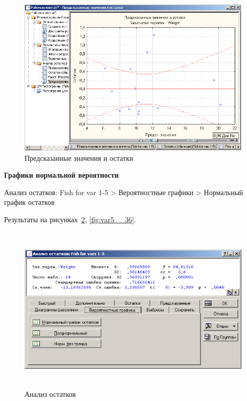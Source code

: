\begin{figure}[!h]
  \centering

  \includegraphics[width=16cm]
  {inc/var5__34.PNG}

  \caption{Предсказанные значения и остатки}

  \label{fig:var5__34}
\end{figure}

\newpage

\textbf{Графики нормальной вероятности}

Анализ остатков: Fish for var 1-5 > Вероятностные графики > Нормальный график остатков

Результаты на рисунках~\ref{fig:var5__35}, \ref{fig:var5__36}.

\begin{figure}[!h]
  \centering

  \includegraphics[height=8cm]
  {inc/var5__35.PNG}

  \caption{Анализ остатков}

  \label{fig:var5__35}
\end{figure}

